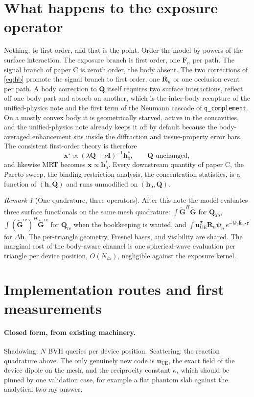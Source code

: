 \documentclass[11pt]{article}
\newcommand{\khat}{\hat{\bm{k}}}
\newcommand{\rr}{\mathbf{r}}
\newcommand{\xx}{\mathbf{x}}
\newcommand{\hh}{\mathbf{h}}
\newcommand{\Gtil}{\tilde{\mathbf{G}}}
\newcommand{\Gre}{\Gtil^{\mathrm{re}}}
\newcommand{\Qmat}{\mathbf{Q}}
\newcommand{\Qabs}{\mathbf{Q}_{\mathrm{ab}}}
\newcommand{\Qref}{\mathbf{Q}_{\mathrm{re}}}
\newcommand{\Fn}{\mathbf{F}_n}
\newcommand{\Rn}{\mathbf{R}_n}
\newcommand{\psin}{\bm{\psi}_n}
\newcommand{\hb}{\hh_{\mathrm{b}}}
\newcommand{\uue}{\mathbf{u}_{\mathrm{UE}}}
\theoremstyle{remark}
\newtheorem{remark}{Remark}
\begin{document}
\section{What happens to the exposure operator}

Nothing, to first order, and that is the point. Order the model by
powers of the surface interaction. The exposure branch is first
order, one $\Fn$ per path. The signal branch of paper C is zeroth
order, the body absent. The two corrections of \cref{eq:hb} promote
the signal branch to first order, one $\Rn$ or one occlusion event
per path. A body correction to $\Qmat$ itself requires two surface
interactions, reflect off one body part and absorb on another, which
is the inter-body recapture of the unified-physics note and the first
term of the Neumann cascade of \texttt{q\_complement}. On a mostly
convex body it is geometrically starved, active in the concavities,
and the unified-physics note already keeps it off by default because
the body-averaged enhancement sits inside the diffraction and
tissue-property error bars. The consistent first-order theory is
therefore
\begin{equation}
  \xx^{\star}
  \propto (\lambda \Qmat + \nu \mathbf{I})^{-1} \hb^{*},
  \qquad \Qmat \text{ unchanged},
\end{equation}
and likewise MRT becomes $\xx \propto \hb^{*}$. Every downstream
quantity of paper C, the Pareto sweep, the binding-restriction
analysis, the concentration statistics, is a function of
$(\hh, \Qmat)$ and runs unmodified on $(\hb, \Qmat)$.

\begin{remark}[One quadrature, three operators]
After this note the model evaluates three surface functionals on the
same mesh quadrature: $\int \Gtil^H \Gtil$ for $\Qabs$,
$\int (\Gre)^H \Gre$ for $\Qref$ when the bookkeeping is wanted, and
$\int \uue^T \Rn \psin\, e^{-i k_0 \khat_n \cdot \rr}$ for
$\Delta\hh$. The per-triangle geometry, Fresnel bases, and
visibility are shared. The marginal cost of the body-aware channel
is one spherical-wave evaluation per triangle per device position,
$O(N_\triangle)$, negligible against the exposure kernel.
\end{remark}

\section{Implementation routes and first measurements}

\paragraph{Closed form, from existing machinery.}
Shadowing: $N$ BVH queries per device position. Scattering: the
reaction quadrature above. The only genuinely new code is $\uue$,
the exact field of the device dipole on the mesh, and the reciprocity
constant $\kappa$, which should be pinned by one validation case, for
example a flat phantom slab against the analytical two-ray answer.
\end{document}

